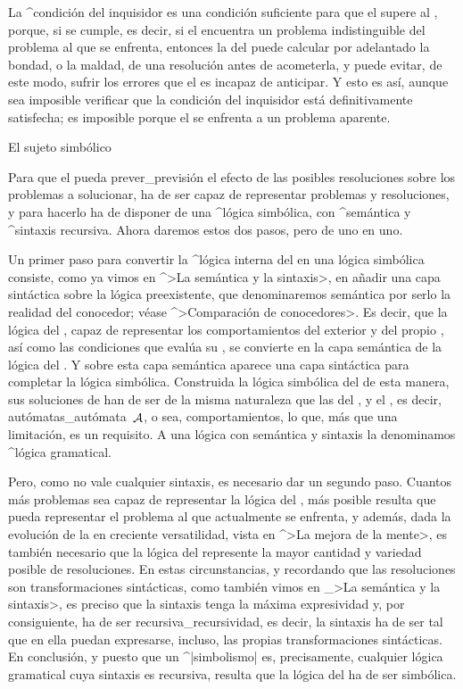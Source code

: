 \noindent La ^{condición del inquisidor} es una condición suficiente
para que el {\sujeto} supere al {\conocedor}, porque, si se cumple, es
decir, si el {\inquisidor} encuentra un problema indistinguible del
problema al que se enfrenta, entonces la {\razon} del {\sujeto} puede
calcular por adelantado la bondad, o la maldad, de una resolución antes
de acometerla, y puede evitar, de este modo, sufrir los errores que el
{\conocedor} es incapaz de anticipar. Y esto es así, aunque sea
imposible verificar que la condición del inquisidor está definitivamente
satisfecha; es imposible porque el {\sujeto} se enfrenta a un problema
aparente.
\endpoints


\Section El sujeto simbólico

Para que el {\sujeto} pueda prever_{previsión} el efecto de las posibles
resoluciones sobre los problemas a solucionar, ha de ser capaz de
representar problemas y resoluciones, y para hacerlo ha de disponer de
una ^{lógica simbólica}, con ^{semántica} y ^{sintaxis} recursiva. Ahora
daremos estos dos pasos, pero de uno en uno.

Un primer paso para convertir la ^{lógica interna} del {\conocedor} en
una lógica simbólica consiste, como ya vimos en ^>La semántica y la
sintaxis>, en añadir una capa sintáctica sobre la lógica preexistente,
que denominaremos semántica por serlo la realidad del conocedor; véase
^>Comparación de conocedores>. Es decir, que la lógica del {\conocedor},
capaz de representar los comportamientos del {\universo} exterior y del
propio {\conocedor}, así como las condiciones que evalúa su
{\inteligencia}, se convierte en la capa semántica de la lógica del
{\sujeto}. Y sobre esta capa semántica aparece una capa sintáctica para
completar la lógica simbólica. Construida la lógica simbólica del
{\sujeto} de esta manera, sus soluciones de han de ser de la misma
naturaleza que las del {\conocedor}, y el {\aprendiz}, es decir,
autómatas_{autómata}~$\aut A$, o sea, comportamientos, lo que, más que
una limitación, es un requisito. A una lógica con semántica y sintaxis
la denominamos ^{lógica gramatical}.

Pero, como no vale cualquier sintaxis, es necesario dar un segundo paso.
Cuantos más problemas sea capaz de representar la lógica del {\sujeto},
más posible resulta que pueda representar el problema al que actualmente
se enfrenta, y además, dada la evolución de la {\mente} en creciente
versatilidad, vista en ^>La mejora de la mente>, es también necesario
que la lógica del {\sujeto} represente la mayor cantidad y variedad
posible de resoluciones. En estas circunstancias, y recordando que las
resoluciones son transformaciones sintácticas, como también vimos en
_>La semántica y la sintaxis>, es preciso que la sintaxis tenga la
máxima expresividad y, por consiguiente, ha de ser
recursiva_{recursividad}, es decir, la sintaxis ha de ser tal que en
ella puedan expresarse, incluso, las propias transformaciones
sintácticas. En conclusión, y puesto que un ^|simbolismo| es,
precisamente, cualquier lógica gramatical cuya sintaxis es recursiva,
resulta que la lógica del {\sujeto} ha de ser simbólica.


